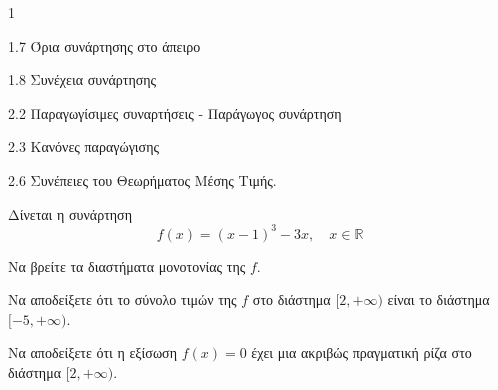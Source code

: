 \begin{ylh}{1}
    \item 1.7 Όρια συνάρτησης στο άπειρο
    \item 1.8 Συνέχεια συνάρτησης
    \item 2.2 Παραγωγίσιμες συναρτήσεις - Παράγωγος συνάρτηση
    \item 2.3 Κανόνες παραγώγισης
    \item 2.6 Συνέπειες του Θεωρήματος Μέσης Τιμής.
\end{ylh}
Δίνεται η συνάρτηση
\[ f(x) = (x - 1)^3 - 3x, \quad x \in \mathbb{R} \]
\begin{alist}
\item Να βρείτε τα διαστήματα μονοτονίας της $f$. 
\item Να αποδείξετε ότι το σύνολο τιμών της $f$ στο διάστημα $[2, +\infty)$ είναι το διάστημα $[-5, +\infty)$. 
\item Να αποδείξετε ότι η εξίσωση $f(x) = 0$ έχει μια ακριβώς πραγματική ρίζα στο διάστημα $[2, +\infty)$. 
\end{alist}